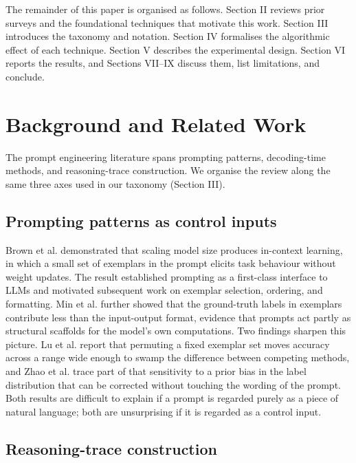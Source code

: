 \documentclass[conference]{IEEEtran}
\begin{document}
The remainder of this paper is organised as follows. Section II reviews prior surveys and the foundational techniques that motivate this work. Section III introduces the taxonomy and notation. Section IV formalises the algorithmic effect of each technique. Section V describes the experimental design. Section VI reports the results, and Sections VII--IX discuss them, list limitations, and conclude.

\section{Background and Related Work}
\label{sec:related}

The prompt engineering literature spans prompting patterns, decoding-time methods, and reasoning-trace construction. We organise the review along the same three axes used in our taxonomy (Section III).

\subsection{Prompting patterns as control inputs}

Brown et al. \cite{b1} demonstrated that scaling model size produces in-context learning, in which a small set of exemplars in the prompt elicits task behaviour without weight updates. The result established prompting as a first-class interface to LLMs and motivated subsequent work on exemplar selection, ordering, and formatting. Min et al. \cite{b2} further showed that the ground-truth labels in exemplars contribute less than the input-output format, evidence that prompts act partly as structural scaffolds for the model's own computations. Two findings sharpen this picture. Lu et al. \cite{b10} report that permuting a fixed exemplar set moves accuracy across a range wide enough to swamp the difference between competing methods, and Zhao et al. \cite{b11} trace part of that sensitivity to a prior bias in the label distribution that can be corrected without touching the wording of the prompt. Both results are difficult to explain if a prompt is regarded purely as a piece of natural language; both are unsurprising if it is regarded as a control input.

\subsection{Reasoning-trace construction}
\end{document}
